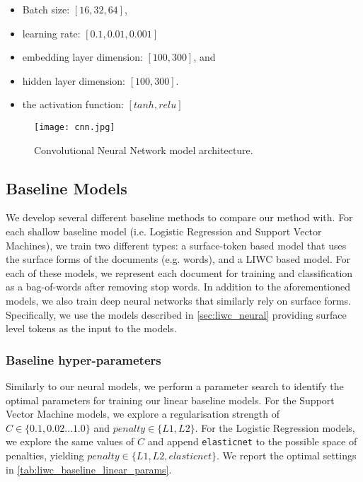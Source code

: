 \begin{itemize}
  \item Batch size: $[16, 32, 64]$,
  \item learning rate: $[0.1, 0.01, 0.001]$
  \item embedding layer dimension: $[100, 300]$, and
  \item hidden layer dimension: $[100, 300]$.
  \item the activation function: $[tanh, relu]$
\end{itemize}

\begin{figure}
  \centering
  \texttt{[image: cnn.jpg]}
  \caption{Convolutional Neural Network model architecture.}
  \label{fig:liwc_cnn}
\end{figure}

\subsection{Baseline Models}

We develop several different baseline methods to compare our method with. For each shallow baseline model (i.e. Logistic Regression and Support Vector Machines), we train two different types: a surface-token based model that uses the surface forms of the documents (e.g. words), and a LIWC based model. For each of these models, we represent each document for training and classification as a bag-of-words after removing stop words. In addition to the aforementioned models, we also train deep neural networks that similarly rely on surface forms. Specifically, we use the models described in \autoref{sec:liwc_neural} providing surface level tokens as the input to the models.

\subsubsection{Baseline hyper-parameters}

Similarly to our neural models, we perform a parameter search to identify the optimal parameters for training our linear baseline models. For the Support Vector Machine models, we explore a regularisation strength of $C \in \{0.1, 0.02 \ldots 1.0\}$ and $penalty \in \{L1, L2\}$. For the Logistic Regression models, we explore the same values of $C$ and append \texttt{elasticnet} to the possible space of penalties, yielding $penalty \in \{L1, L2, elasticnet\}$. We report the optimal settings in \autoref{tab:liwc_baseline_linear_params}.

